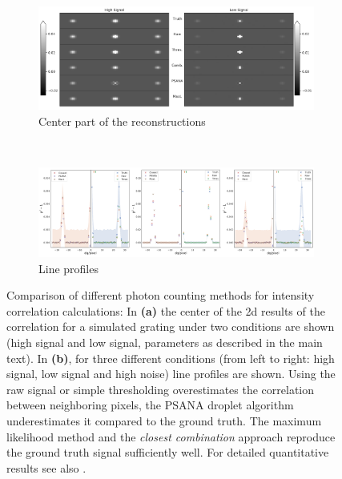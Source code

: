 \begin{figure}
	\centering
	\hspace{0.05\textwidth}
	\begin{subfigure}[b]{0.9\textwidth}
		\includegraphics[width=\linewidth]{images/photonreconimg.pdf}	
		\caption{Center part of the reconstructions}
		\label{fig:photonreconimg}
	\end{subfigure}
	\\
	\begin{subfigure}[b]{0.98\textwidth}
		\includegraphics[width=\linewidth]{images/photonrecon.pdf}
		\caption{Line profiles}
		\label{fig:photonrecon}
	\end{subfigure}	
	
	\caption[Comparison of different photon counting methods for intensity correlation calculations]{Comparison of different photon counting methods for intensity correlation calculations: In \textbf{(a)} the center of the 2d results of the correlation for a simulated grating under two conditions are shown (high signal and low signal, parameters as described in the main text). In  \textbf{(b)}, for three different conditions (from left to right: high signal, low signal and high noise) line profiles are shown. Using the raw signal or simple thresholding overestimates the correlation between neighboring pixels, the PSANA droplet algorithm underestimates it compared to the ground truth. The maximum likelihood method and the \textit{closest combination} approach reproduce the ground truth signal sufficiently well. For detailed quantitative results see also .}
\end{figure}
